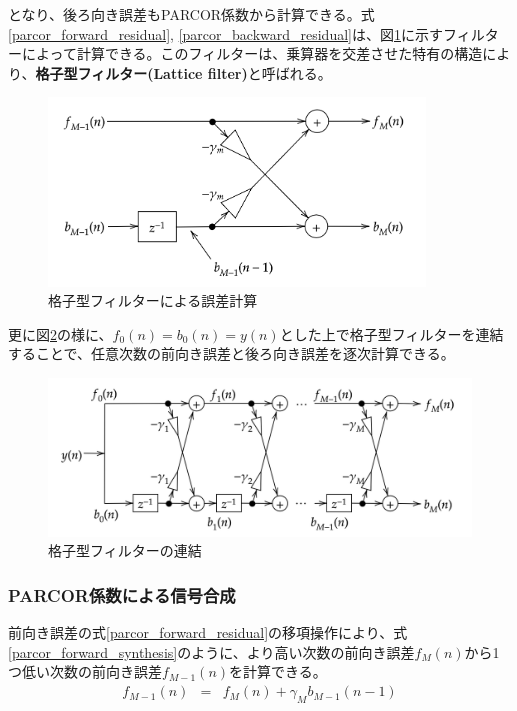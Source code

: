 \documentclass[uplatex,dvipdfmx,b5j,10pt]{jsbook}
\theoremstyle{definition}
\begin{document}
となり、後ろ向き誤差もPARCOR係数から計算できる。式\ref{parcor_forward_residual}, \ref{parcor_backward_residual}は、図\ref{lattice_filter_residual}に示すフィルターによって計算できる。このフィルターは、乗算器を交差させた特有の構造により、\textbf{格子型フィルター(Lattice filter)}と呼ばれる。
\begin{figure}[htbp]
  \begin{center}
    \includegraphics[width=100mm]{./figs/lattice_filter.png}
    \caption{格子型フィルターによる誤差計算} \label{lattice_filter_residual}
  \end{center}
\end{figure}

更に図\ref{cascaded_lattice_filter_residual}の様に、$f_{0}(n) = b_{0}(n) = y(n)$とした上で格子型フィルターを連結することで、任意次数の前向き誤差と後ろ向き誤差を逐次計算できる。
\begin{figure}[htbp]
  \begin{center}
    \includegraphics[width=120mm]{./figs/cascaded_lattice_filter_residual.png}
    \caption{格子型フィルターの連結} \label{cascaded_lattice_filter_residual}
  \end{center}
\end{figure}

\subsubsection{PARCOR係数による信号合成}

前向き誤差の式\ref{parcor_forward_residual}の移項操作により、式\ref{parcor_forward_synthesis}のように、より高い次数の前向き誤差$f_{M}(n)$から1つ低い次数の前向き誤差$f_{M-1}(n)$を計算できる。
\begin{eqnarray}
  f_{M-1}(n) &=& f_{M}(n) + \gamma_{M} b_{M-1}(n-1) \label{parcor_forward_synthesis}
\end{eqnarray}
\end{document}
